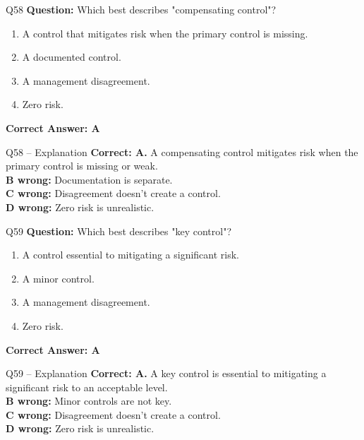 \documentclass[aspectratio=169,10pt]{beamer}
\begin{document}
	\begin{frame}[t]{Q58}
		\small
		\textbf{Question:} Which best describes "compensating control"?
		\begin{enumerate}[label=\Alph*.,itemsep=1pt,topsep=2pt]
			\item A control that mitigates risk when the primary control is missing.
			\item A documented control.
			\item A management disagreement.
			\item Zero risk.
		\end{enumerate}
		\vspace{4pt}
		\textbf{Correct Answer: A}
	\end{frame}
	
	\begin{frame}[t]{Q58 -- Explanation}
		\small
		\textbf{Correct: A.} A compensating control mitigates risk when the primary control is missing or weak. \\[4pt]
		\textbf{B wrong:} Documentation is separate. \\[2pt]
		\textbf{C wrong:} Disagreement doesn't create a control. \\[2pt]
		\textbf{D wrong:} Zero risk is unrealistic.
	\end{frame}
	
	\begin{frame}[t]{Q59}
		\small
		\textbf{Question:} Which best describes "key control"?
		\begin{enumerate}[label=\Alph*.,itemsep=1pt,topsep=2pt]
			\item A control essential to mitigating a significant risk.
			\item A minor control.
			\item A management disagreement.
			\item Zero risk.
		\end{enumerate}
		\vspace{4pt}
		\textbf{Correct Answer: A}
	\end{frame}
	
	\begin{frame}[t]{Q59 -- Explanation}
		\small
		\textbf{Correct: A.} A key control is essential to mitigating a significant risk to an acceptable level. \\[4pt]
		\textbf{B wrong:} Minor controls are not key. \\[2pt]
		\textbf{C wrong:} Disagreement doesn't create a control. \\[2pt]
		\textbf{D wrong:} Zero risk is unrealistic.
	\end{frame}
	
\end{document}

